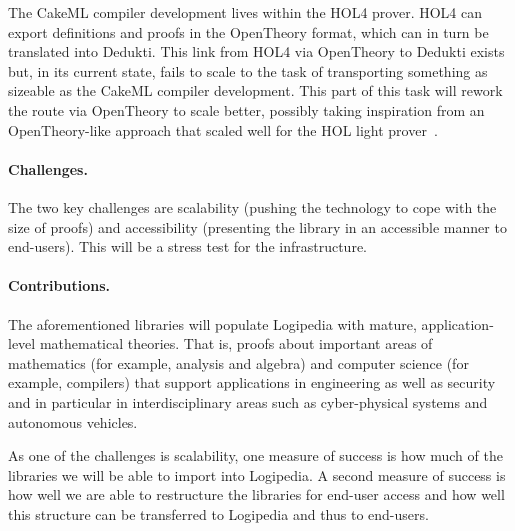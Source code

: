 \medskip

The CakeML compiler development lives within the HOL4 prover. HOL4 can
export definitions and proofs in the OpenTheory format, which can in
turn be translated into Dedukti. This link from HOL4 via OpenTheory to
Dedukti exists but, in its current state, fails to scale to the task
of transporting something as sizeable as the CakeML compiler
development. This part of this task will rework the route via
OpenTheory to scale better, possibly taking inspiration from an
OpenTheory-like approach that scaled well for the HOL light
prover~\cite{KaliszykK13}.


\paragraph*{Challenges.}
The two key challenges are scalability (pushing the technology to cope
with the size of proofs) and accessibility (presenting the library in
an accessible manner to end-users). This will be a stress test for the
infrastructure.

\paragraph*{Contributions.}
The aforementioned libraries will populate Logipedia with mature,
application-level mathematical theories. That is, proofs about
important areas of mathematics (for example, analysis and algebra) and
computer science (for example, compilers) that support applications in
engineering as well as security and in particular in interdisciplinary
areas such as cyber-physical systems and autonomous vehicles.

As one of the challenges is scalability, one measure of success is how
much of the libraries we will be able to import into Logipedia. A
second measure of success is how well we are able to restructure the
libraries for end-user access and how well this structure can be
transferred to Logipedia and thus to end-users.

